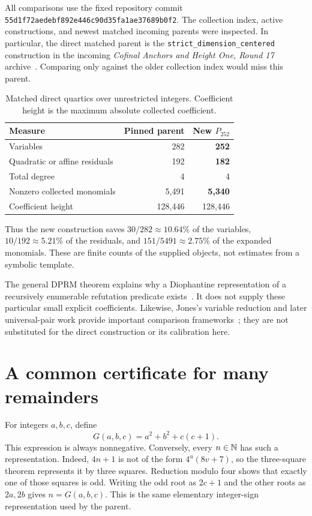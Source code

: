 \documentclass[11pt,letterpaper]{article}
\theoremstyle{remark}\newtheorem{remark}[theorem]{Remark}
\newcommand{\file}[1]{\nolinkurl{#1}}
\newcommand{\sourcepin}{\nolinkurl{55d1f72aedebf892e446c90d35fa1ae37689b0f2}}
\begin{document}
All comparisons use the fixed repository commit \sourcepin. The collection
index, active constructions, and newest matched incoming parents were
inspected. In particular, the direct matched parent is the
\file{strict_dimension_centered} construction in the incoming
\emph{Cofinal Anchors and Height One, Round 17} archive~\cite{round17}.
Comparing only against the older collection index would miss this parent.

\begin{table}[ht]
\centering
\caption{Matched direct quartics over unrestricted integers. Coefficient
height is the maximum absolute collected coefficient.}
\begin{tabular}{@{}lrr@{}}
\toprule
Measure & Pinned parent & New $P_{252}$\\
\midrule
Variables & 282 & \textbf{252}\\
Quadratic or affine residuals & 192 & \textbf{182}\\
Total degree & 4 & 4\\
Nonzero collected monomials & 5,491 & \textbf{5,340}\\
Coefficient height & 128,446 & 128,446\\
\bottomrule
\end{tabular}
\end{table}

Thus the new construction saves $30/282\approx10.64\%$ of the variables,
$10/192\approx5.21\%$ of the residuals, and $151/5491\approx2.75\%$ of
the expanded monomials. These are finite counts of the supplied objects,
not estimates from a symbolic template.

The general DPRM theorem explains why a Diophantine representation of a
recursively enumerable refutation predicate exists~\cite{matiyasevich}.
It does not supply these particular small explicit coefficients. Likewise,
Jones's variable reduction and later universal-pair work provide important
comparison frameworks~\cite{jones,bayer}; they are not substituted for
the direct construction or its calibration here.

\section{A common certificate for many remainders}\label{sec:lemma}

For integers $a,b,c$, define
\[
 G(a,b,c)=a^2+b^2+c(c+1).
\]
This expression is always nonnegative. Conversely, every $n\in\mathbb N$ has
such a representation. Indeed, $4n+1$ is not of the form
$4^u(8v+7)$, so the three-square theorem represents it by three squares.
Reduction modulo four shows that exactly one of those squares is odd.
Writing the odd root as $2c+1$ and the other roots as $2a,2b$ gives
$n=G(a,b,c)$. This is the same elementary integer-sign representation
used by the parent.
\end{document}
